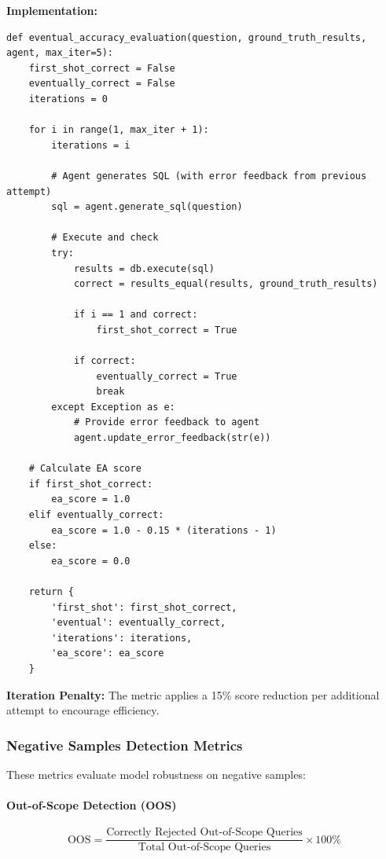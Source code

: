 \textbf{Implementation:}
\begin{lstlisting}[style=pythonstyle]
def eventual_accuracy_evaluation(question, ground_truth_results, agent, max_iter=5):
    first_shot_correct = False
    eventually_correct = False
    iterations = 0
    
    for i in range(1, max_iter + 1):
        iterations = i
        
        # Agent generates SQL (with error feedback from previous attempt)
        sql = agent.generate_sql(question)
        
        # Execute and check
        try:
            results = db.execute(sql)
            correct = results_equal(results, ground_truth_results)
            
            if i == 1 and correct:
                first_shot_correct = True
            
            if correct:
                eventually_correct = True
                break
        except Exception as e:
            # Provide error feedback to agent
            agent.update_error_feedback(str(e))
    
    # Calculate EA score
    if first_shot_correct:
        ea_score = 1.0
    elif eventually_correct:
        ea_score = 1.0 - 0.15 * (iterations - 1)
    else:
        ea_score = 0.0
    
    return {
        'first_shot': first_shot_correct,
        'eventual': eventually_correct,
        'iterations': iterations,
        'ea_score': ea_score
    }
\end{lstlisting}



\textbf{Iteration Penalty:} The metric applies a 15\% score reduction per additional attempt to encourage efficiency.

\subsubsection{Negative Samples Detection Metrics}

These metrics evaluate model robustness on negative samples:

\paragraph{Out-of-Scope Detection (OOS)}

\begin{equation}
\text{OOS} = \frac{\text{Correctly Rejected Out-of-Scope Queries}}{\text{Total Out-of-Scope Queries}} \times 100\%
\end{equation}

